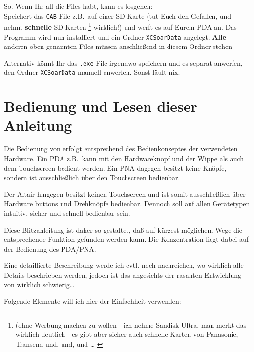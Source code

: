 So. Wenn Ihr all die Files habt, kann es losgehen:\\[1em]

Speichert das \texttt{CAB}-File z.B.\ auf einer SD-Karte (tut Euch den Gefallen, und nehmt \textbf{schnelle} SD-Karten \footnote{(ohne Werbung machen zu wollen - ich nehme Sandisk Ultra, man merkt das wirklich deutlich - es gibt aber sicher auch schnelle Karten von Panasonic, Transend  und, und, und \dots - } wirklich!) und werft es \merkes auf Eurem \textsf{PDA} an. Das Programm wird  nun installiert und ein Ordner \texttt{XCSoarData} angelegt. \textbf{Alle} anderen oben genannten Files müssen anschließend in diesem Ordner stehen!

Alternativ könnt Ihr das \texttt{.exe} File irgendwo speichern und es separat anwerfen,
den Ordner \texttt{XCSoarData} manuell anwerfen. Sonst läuft nix.
%
\section{Bedienung und Lesen dieser Anleitung}
Die Bedienung von \xc erfolgt entsprechend des Bedienkonzeptes der verwendeten Hardware.
Ein \textsf{PDA} z.B.\ kann mit den Hardwareknopf und der Wippe als auch dem Touchscreen
bedient werden. Ein \textsf{PNA} dagegen besitzt keine Knöpfe, sondern ist ausschließlich über den Touchscreen bedienbar. 

Der \textsf{Altair} hingegen besitzt keinen Touchscreen und ist somit ausschließlich über Hardware buttons und Drehknöpfe bedienbar. Dennoch soll \xc auf allen Gerätetypen intuitiv, sicher und schnell bedienbar sein.

Diese Blitzanleitung ist daher so gestaltet, daß auf kürzest möglichem Wege die entsprechende Funktion gefunden werden kann. Die Konzentration liegt dabei auf der Bedienung des \textsf{PDA/PNA}.

Eine detaillierte Beschreibung werde ich evtl. noch nachreichen, wo wirklich alle Details beschrieben werden, jedoch ist das angesichts der rasanten Entwicklung von \xc wirklich schwierig\dots

Folgende Elemente will ich hier der Einfachheit verwenden:


